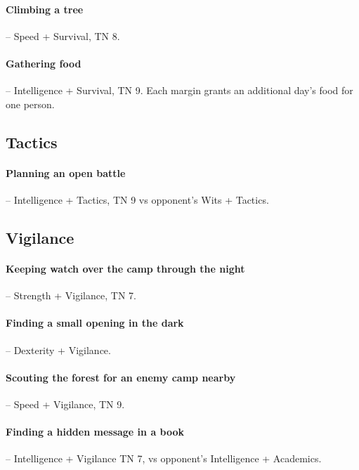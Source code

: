 \begin{multicols}{2}
\paragraph{Climbing a tree} -- Speed + Survival, TN 8.

\paragraph{Gathering food} -- Intelligence + Survival, TN 9.
Each margin grants an additional day's food for one person.

\subsection{Tactics}

\paragraph{Planning an open battle} -- Intelligence + Tactics, TN 9 vs opponent's Wits + Tactics.

\subsection{Vigilance}

\paragraph{Keeping watch over the camp through the night} -- Strength + Vigilance, TN 7.

\paragraph{Finding a small opening in the dark} -- Dexterity + Vigilance.

\paragraph{Scouting the forest for an enemy camp nearby} -- Speed + Vigilance, TN 9.

\paragraph{Finding a hidden message in a book} -- Intelligence + Vigilance TN 7, vs opponent's Intelligence + Academics.

\vfill\null

\end{multicols}
